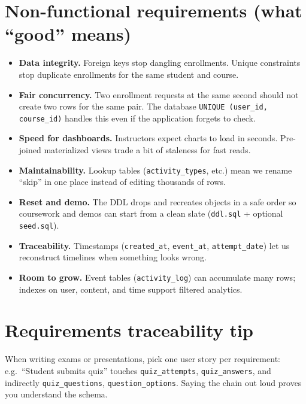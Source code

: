 \section{Non-functional requirements (what ``good'' means)}
\begin{itemize}[leftmargin=*]
  \item \textbf{Data integrity.} Foreign keys stop dangling enrollments. Unique constraints stop duplicate enrollments for the same student and course.

  \item \textbf{Fair concurrency.} Two enrollment requests at the same second should not create two rows for the same pair. The database \texttt{UNIQUE (user\_id, course\_id)} handles this even if the application forgets to check.

  \item \textbf{Speed for dashboards.} Instructors expect charts to load in seconds. Pre-joined materialized views trade a bit of staleness for fast reads.

  \item \textbf{Maintainability.} Lookup tables (\texttt{activity\_types}, etc.) mean we rename ``skip'' in one place instead of editing thousands of rows.

  \item \textbf{Reset and demo.} The DDL drops and recreates objects in a safe order so coursework and demos can start from a clean slate (\texttt{ddl.sql} + optional \texttt{seed.sql}).

  \item \textbf{Traceability.} Timestamps (\texttt{created\_at}, \texttt{event\_at}, \texttt{attempt\_date}) let us reconstruct timelines when something looks wrong.

  \item \textbf{Room to grow.} Event tables (\texttt{activity\_log}) can accumulate many rows; indexes on user, content, and time support filtered analytics.
\end{itemize}

\section{Requirements traceability tip}
When writing exams or presentations, pick one user story per requirement: e.g.\ ``Student submits quiz'' touches \texttt{quiz\_attempts}, \texttt{quiz\_answers}, and indirectly \texttt{quiz\_questions}, \texttt{question\_options}. Saying the chain out loud proves you understand the schema.
